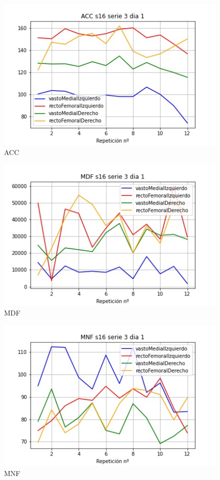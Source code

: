 \begin{figure}[ht]
	\centering
  \includegraphics[width=1.0\textwidth]{imagenes/caracteristicas/ACC s16 serie 3 dia 1.jpg}
  \caption{ ACC}
  \label{fig:acc}
\end{figure}
\begin{figure}[ht]
	\centering
  \includegraphics[width=1.0\textwidth]{imagenes/caracteristicas/MDF s16 serie 3 dia 1.jpg}
  \caption{ MDF}
  \label{fig:mdf}
\end{figure}
\begin{figure}[ht]
	\centering
  \includegraphics[width=1.0\textwidth]{imagenes/caracteristicas/MNF s16 serie 3 dia 1.jpg}
  \caption{ MNF}
  \label{fig:mnf}
\end{figure}
